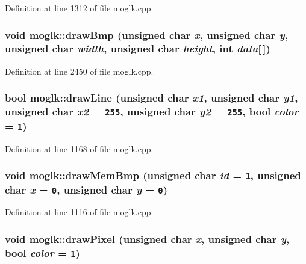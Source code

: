 Definition at line 1312 of file moglk.cpp.\hypertarget{classmoglk_38ad099b570c6f81d9a5ae6251ae77d1}{
\subsubsection[{drawBmp}]{\setlength{\rightskip}{0pt plus 5cm}void moglk::drawBmp (unsigned char {\em x}, \/  unsigned char {\em y}, \/  unsigned char {\em width}, \/  unsigned char {\em height}, \/  int {\em data}\mbox{[}$\,$\mbox{]})}}
\label{classmoglk_38ad099b570c6f81d9a5ae6251ae77d1}




Definition at line 2450 of file moglk.cpp.\hypertarget{classmoglk_d77d8ff35162a554708c3e93c37e0c7a}{
\subsubsection[{drawLine}]{\setlength{\rightskip}{0pt plus 5cm}bool moglk::drawLine (unsigned char {\em x1}, \/  unsigned char {\em y1}, \/  unsigned char {\em x2} = {\tt 255}, \/  unsigned char {\em y2} = {\tt 255}, \/  bool {\em color} = {\tt 1})}}
\label{classmoglk_d77d8ff35162a554708c3e93c37e0c7a}




Definition at line 1168 of file moglk.cpp.\hypertarget{classmoglk_db45e510307e1c98467d4ee31cc845a6}{
\subsubsection[{drawMemBmp}]{\setlength{\rightskip}{0pt plus 5cm}void moglk::drawMemBmp (unsigned char {\em id} = {\tt 1}, \/  unsigned char {\em x} = {\tt 0}, \/  unsigned char {\em y} = {\tt 0})}}
\label{classmoglk_db45e510307e1c98467d4ee31cc845a6}




Definition at line 1116 of file moglk.cpp.\hypertarget{classmoglk_903c108a85fd088ce9d0f2520773a781}{
\subsubsection[{drawPixel}]{\setlength{\rightskip}{0pt plus 5cm}void moglk::drawPixel (unsigned char {\em x}, \/  unsigned char {\em y}, \/  bool {\em color} = {\tt 1})}}
\label{classmoglk_903c108a85fd088ce9d0f2520773a781}




